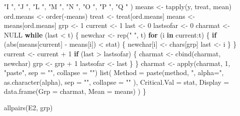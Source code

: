 \documentclass[
]{book}
\newenvironment{Shaded}{\begin{snugshade}}{\end{snugshade}}
\newcommand{\AttributeTok}[1]{\textcolor[rgb]{0.77,0.63,0.00}{#1}}
\newcommand{\ConstantTok}[1]{\textcolor[rgb]{0.00,0.00,0.00}{#1}}
\newcommand{\ControlFlowTok}[1]{\textcolor[rgb]{0.13,0.29,0.53}{\textbf{#1}}}
\newcommand{\DecValTok}[1]{\textcolor[rgb]{0.00,0.00,0.81}{#1}}
\newcommand{\FunctionTok}[1]{\textcolor[rgb]{0.00,0.00,0.00}{#1}}
\newcommand{\NormalTok}[1]{#1}
\newcommand{\OtherTok}[1]{\textcolor[rgb]{0.56,0.35,0.01}{#1}}
\newcommand{\SpecialCharTok}[1]{\textcolor[rgb]{0.00,0.00,0.00}{#1}}
\newcommand{\StringTok}[1]{\textcolor[rgb]{0.31,0.60,0.02}{#1}}
\begin{document}
\begin{Shaded}
\begin{Highlighting}[]
    \StringTok{"I "}\NormalTok{, }\StringTok{"J "}\NormalTok{, }\StringTok{"L "}\NormalTok{, }\StringTok{"M "}\NormalTok{, }\StringTok{"N "}\NormalTok{, }\StringTok{"O "}\NormalTok{, }\StringTok{"P "}\NormalTok{, }\StringTok{"Q "}
\NormalTok{  )}
\NormalTok{  means }\OtherTok{\textless{}{-}} \FunctionTok{tapply}\NormalTok{(y, treat, mean)}
\NormalTok{  ord.means }\OtherTok{\textless{}{-}} \FunctionTok{order}\NormalTok{(}\SpecialCharTok{{-}}\NormalTok{means)}
\NormalTok{  treat }\OtherTok{\textless{}{-}}\NormalTok{ treat[ord.means]}
\NormalTok{  means }\OtherTok{\textless{}{-}}\NormalTok{ means[ord.means]}
\NormalTok{  grp }\OtherTok{\textless{}{-}} \DecValTok{1}
\NormalTok{  current }\OtherTok{\textless{}{-}} \DecValTok{1}
\NormalTok{  last }\OtherTok{\textless{}{-}} \DecValTok{0}
\NormalTok{  lastsofar }\OtherTok{\textless{}{-}} \DecValTok{0}
\NormalTok{  charmat }\OtherTok{\textless{}{-}} \ConstantTok{NULL}
  \ControlFlowTok{while}\NormalTok{ (last }\SpecialCharTok{\textless{}}\NormalTok{ t) \{}
\NormalTok{    newchar }\OtherTok{\textless{}{-}} \FunctionTok{rep}\NormalTok{(}\StringTok{"  "}\NormalTok{, t)}
    \ControlFlowTok{for}\NormalTok{ (i }\ControlFlowTok{in}\NormalTok{ current}\SpecialCharTok{:}\NormalTok{t) \{}
      \ControlFlowTok{if}\NormalTok{ (}\FunctionTok{abs}\NormalTok{(means[current] }\SpecialCharTok{{-}}\NormalTok{ means[i]) }\SpecialCharTok{\textless{}}\NormalTok{ stat) \{}
\NormalTok{        newchar[i] }\OtherTok{\textless{}{-}}\NormalTok{ chars[grp]}
\NormalTok{        last }\OtherTok{\textless{}{-}}\NormalTok{ i}
\NormalTok{      \}}
\NormalTok{    \}}
\NormalTok{    current }\OtherTok{\textless{}{-}}\NormalTok{ current }\SpecialCharTok{+} \DecValTok{1}
    \ControlFlowTok{if}\NormalTok{ (last }\SpecialCharTok{\textgreater{}}\NormalTok{ lastsofar) \{}
\NormalTok{      charmat }\OtherTok{\textless{}{-}} \FunctionTok{cbind}\NormalTok{(charmat, newchar)}
\NormalTok{      grp }\OtherTok{\textless{}{-}}\NormalTok{ grp }\SpecialCharTok{+} \DecValTok{1}
\NormalTok{      lastsofar }\OtherTok{\textless{}{-}}\NormalTok{ last}
\NormalTok{    \}}
\NormalTok{  \}}
\NormalTok{  charmat }\OtherTok{\textless{}{-}} \FunctionTok{apply}\NormalTok{(charmat, }\DecValTok{1}\NormalTok{, }\StringTok{"paste"}\NormalTok{, }\AttributeTok{sep =} \StringTok{""}\NormalTok{, }\AttributeTok{collapse =} \StringTok{""}\NormalTok{)}
  \FunctionTok{list}\NormalTok{(}
    \AttributeTok{Method =} \FunctionTok{paste}\NormalTok{(method, }\StringTok{", alpha="}\NormalTok{, }\FunctionTok{as.character}\NormalTok{(alpha),}
      \AttributeTok{sep =} \StringTok{""}\NormalTok{, }\AttributeTok{collapse =} \StringTok{""}
\NormalTok{    ),}
    \AttributeTok{Critical.Val =}\NormalTok{ stat,}
    \AttributeTok{Display =} \FunctionTok{data.frame}\NormalTok{(}\AttributeTok{Grp =}\NormalTok{ charmat, }\AttributeTok{Mean =}\NormalTok{ means)}
\NormalTok{  )}
\NormalTok{\}}


\FunctionTok{allpairs}\NormalTok{(E2, grp)}
\end{Highlighting}
\end{Shaded}
\end{document}
